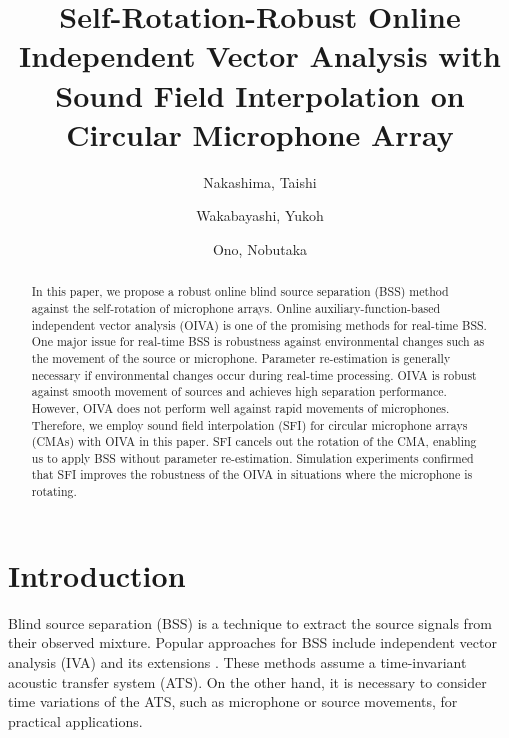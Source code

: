 \documentclass[sip,biber]{now-journal}
\title{Self-Rotation-Robust Online Independent Vector Analysis with\\Sound Field Interpolation on Circular Microphone Array}
\author{Nakashima, Taishi}
\affil{Tokyo Metropolitan University, Tokyo, Japan}
\author{Wakabayashi, Yukoh}
\affil{Toyohashi University of Technology, Aichi, Japan}
\author[1]{Ono, Nobutaka}
\begin{document}
\begin{abstract}
  In this paper, we propose a robust online blind source separation (BSS) method against the self-rotation of microphone arrays.
  Online auxiliary-function-based independent vector analysis (OIVA) is one of the promising methods for real-time BSS.
  One major issue for real-time BSS is robustness against environmental changes such as the movement of the source or microphone.
  Parameter re-estimation is generally necessary if environmental changes occur during real-time processing.
  OIVA is robust against smooth movement of sources and achieves high separation performance.
  However, OIVA does not perform well against rapid movements of microphones.
  Therefore, we employ sound field interpolation (SFI) for circular microphone arrays (CMAs) with OIVA in this paper.
  SFI cancels out the rotation of the CMA, enabling us to apply BSS without parameter re-estimation.
  Simulation experiments confirmed that SFI improves the robustness of the OIVA in situations where the microphone is rotating.
\end{abstract}

\section{Introduction}\label{sec:intro}
Blind source separation (BSS) \cite{Makino:2018:ASS} is a technique to extract the source signals from their observed mixture.
Popular approaches for BSS include independent vector analysis (IVA) \cite{Kim:2006:ASLP,Hiroe:2006:ICA} and its extensions \cite{Kitamura:2016:ASLP,Nugraha:2020:SPL,Brendel:2020:SP}.
These methods assume a time-invariant acoustic transfer system (ATS).
On the other hand, it is necessary to consider time variations of the ATS, such as microphone or source movements, for practical applications.
\end{document}
